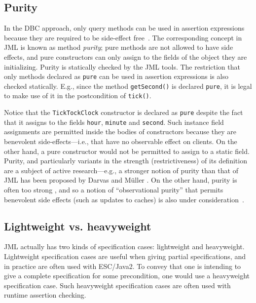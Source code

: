 \documentclass{llncs}
\begin{document}
\subsection{Purity}
\label{Sec:purity}
%
In the DBC approach, only query methods can be used in assertion expressions
because they are required to be side-effect free~\cite{Meyer97}.
% 
The corresponding concept in JML is known as method \emph{purity};
pure methods are not allowed to have side effects, and pure
constructors can only assign to the fields of the object they are initializing.
Purity is statically checked by the JML tools.
The restriction that only methods
declared as \texttt{pure} can be used in assertion expressions is also
checked statically.
E.g., since the method \texttt{getSecond()} is declared \texttt{pure}, it is
legal to make use of it in the postcondition of \texttt{tick()}.

Notice that the \texttt{TickTockClock} constructor is declared as \texttt{pure}
despite the fact 
that it assigns to the fields \texttt{hour}, \texttt{minute} and \texttt{second}.
Such instance field assignments are permitted inside the bodies of constructors
because they are benevolent side-effects---i.e., that have no observable effect
on clients.
%
On the other hand, a pure constructor would not be permitted to assign to a static
field.
%
Purity, and particularly variants in the strength (restrictiveness) of its
definition are a subject of active research---e.g., a stronger notion of purity
than that of JML has been proposed by Darvas and M\"uller
\cite{DarvasMuller05}.  On the other hand, purity is often too strong
\cite{Leavens-etal05}, and so a notion of ``observational purity''
that permits benevolent side effects (such as updates to caches) is
also under consideration~\cite{Barnett-etal04a,Naumann05}.

\subsection{Lightweight vs. heavyweight}

JML actually has two kinds of specification cases: lightweight and heavyweight.
Lightweight specification cases are useful when giving partial
specifications, and in practice are often used with ESC/Java2.  To
convey that one is intending to give a complete specification for some
precondition, one would use a heavyweight specification case.
Such heavyweight specification cases are often used with runtime
assertion checking.
\end{document}
